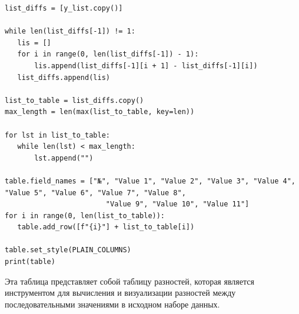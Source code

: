 \documentclass{article}
\begin{document}
\begin{lstlisting}
list_diffs = [y_list.copy()]

while len(list_diffs[-1]) != 1:
   lis = []
   for i in range(0, len(list_diffs[-1]) - 1):
       lis.append(list_diffs[-1][i + 1] - list_diffs[-1][i])
   list_diffs.append(lis)

list_to_table = list_diffs.copy()
max_length = len(max(list_to_table, key=len))

for lst in list_to_table:
   while len(lst) < max_length:
       lst.append("")

table.field_names = ["№", "Value 1", "Value 2", "Value 3", "Value 4",
"Value 5", "Value 6", "Value 7", "Value 8",
                        "Value 9", "Value 10", "Value 11"]
for i in range(0, len(list_to_table)):
   table.add_row([f"{i}"] + list_to_table[i])

table.set_style(PLAIN_COLUMNS)
print(table)

\end{lstlisting}

Эта таблица представляет собой таблицу разностей, которая является инструментом для вычисления и визуализации разностей между последовательными значениями в исходном наборе данных. 
\end{document}
